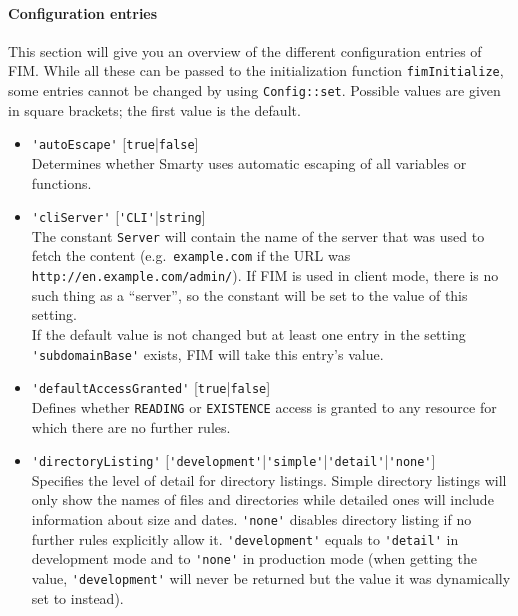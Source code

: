 \documentclass{scrartcl}
\begin{document}
      \paragraph{Configuration entries}
         This section will give you an overview of the different configuration entries of FIM. While all these can be passed to the initialization function \lstinline!fimInitialize!, some entries cannot be changed by using \lstinline!Config::set!. Possible values are given in square brackets; the first value is the default.
         \begin{itemize}
            \item \lstinline!'autoEscape'! [\lstinline!true!|\lstinline!false!] \\
               Determines whether Smarty uses automatic escaping of all variables or functions.
            \item \lstinline!'cliServer'! [\lstinline!'CLI'!|\lstinline!string!] \\
               The constant \lstinline!Server! will contain the name of the server that was used to fetch the content (e.g.\ \texttt{example.com} if the URL was \texttt{http://en.example.com/admin/}). If FIM is used in client mode, there is no such thing as a ``server'', so the constant will be set to the value of this setting. \\
               If the default value is not changed but at least one entry in the setting \lstinline!'subdomainBase'! exists, FIM will take this entry's value.
            \item \lstinline!'defaultAccessGranted'! [\lstinline!true!|\lstinline!false!] \\
               Defines whether \texttt{READING} or \texttt{EXISTENCE} access is granted to any resource for which there are no further rules.
            \item \lstinline!'directoryListing'! [\lstinline!'development'!|\lstinline!'simple'!|\lstinline!'detail'!|\lstinline!'none'!] \\
               Specifies the level of detail for directory listings. Simple directory listings will only show the names of files and directories while detailed ones will include information about size and dates. \lstinline!'none'! disables directory listing if no further rules explicitly allow it. \lstinline!'development'! equals to \lstinline!'detail'! in development mode and to \lstinline!'none'! in production mode (when getting the value, \lstinline!'development'! will never be returned but the value it was dynamically set to instead). \\

\end{itemize}
\end{document}
